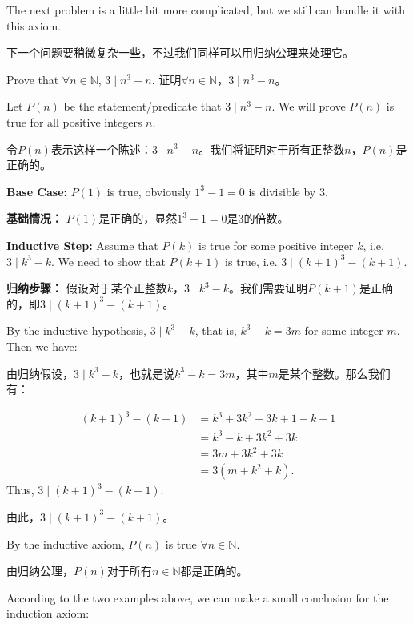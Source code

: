 \documentclass{Math_Note}
\begin{document}
The next problem is a little bit more complicated, but we still can handle it with this axiom.

下一个问题要稍微复杂一些，不过我们同样可以用归纳公理来处理它。

\begin{prb}
    Prove that $\forall n \in \mathbb{N}$, $3 \mid n^{3}-n$.
    证明$\forall n \in \mathbb{N}$，$3 \mid n^{3}-n$。
\end{prb}

\begin{sol}
    Let $P(n)$ be the statement/predicate that $3 \mid n^{3}-n$. We will prove $P(n)$ is true for all positive integers $n$.

    令$P(n)$表示这样一个陈述：$3 \mid n^{3}-n$。我们将证明对于所有正整数$n$，$P(n)$是正确的。

    \textbf{Base Case:} $P(1)$ is true, obviously $1^{3}-1=0$ is divisible by 3.

    \textbf{基础情况：} $P(1)$是正确的，显然$1^{3}-1=0$是3的倍数。

    \textbf{Inductive Step:} Assume that $P(k)$ is true for some positive integer $k$, i.e. $3 \mid k^{3}-k$. We need to show that $P(k+1)$ is true, i.e. $3 \mid (k+1)^{3}-(k+1)$.

    \textbf{归纳步骤：} 假设对于某个正整数$k$，$3 \mid k^{3}-k$。我们需要证明$P(k+1)$是正确的，即$3 \mid (k+1)^{3}-(k+1)$。

    By the inductive hypothesis, $3 \mid k^{3}-k$, that is, $k^{3}-k=3m$ for some integer $m$. Then we have: 

    由归纳假设，$3 \mid k^{3}-k$，也就是说$k^{3}-k=3m$，其中$m$是某个整数。那么我们有：

    \begin{align*}
        (k+1)^{3}-(k+1) &= k^{3}+3k^{2}+3k+1-k-1\\
        &= k^{3}-k+3k^{2}+3k\\
        &= 3m+3k^{2}+3k\\
        &= 3(m+k^{2}+k).
    \end{align*}
    Thus, $3 \mid (k+1)^{3}-(k+1)$.

    由此，$3 \mid (k+1)^{3}-(k+1)$。

    By the inductive axiom, $P(n)$ is true $\forall n \in \mathbb{N}$.

    由归纳公理，$P(n)$对于所有$n \in \mathbb{N}$都是正确的。
\end{sol}

According to the two examples above, we can make a small conclusion for the induction axiom:
\end{document}
